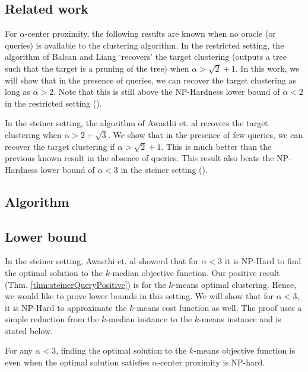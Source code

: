 \documentclass[orivec]{llncs}
\begin{document}
\subsection{Related work}
\label{section:relatedwork}
For $\alpha$-center proximity, the following results are known when no oracle (or queries) is available to the clustering algorithm. In the restricted setting, the algorithm of Balcan and Liang \cite{balcan2012clustering} `recovers' the target clustering (outputs a tree such that the target is a pruning of the tree) when $\alpha > \sqrt{2} + 1$. In this work, we will show that in the presence of queries, we can recover the target clustering as long as $\alpha > 2$. Note that this is still above the NP-Hardness lower bound of $\alpha < 2$ in the restricted setting (\cite{ben2014data}).

In the steiner setting, the algorithm of Awasthi et. al \cite{awasthi2012center} recovers the target clustering when $\alpha > 2+\sqrt{3}$. We show that in the presence of few queries, we can recover the target clustering if $\alpha > \sqrt{2}+1$. This is much better than the previous known result in the absence of queries. This result also beats the NP-Hardness lower bound of $\alpha < 3$ in the steiner setting (\cite{awasthi2012center}).

\subsection{Algorithm}


\subsection{Lower bound}
In the steiner setting, Awasthi et. al \cite{awasthi2012center} showerd that for $\alpha < 3$ it is NP-Hard to find the optimal solution to the $k$-median objective function. Our positive result (Thm. \ref{thm:steinerQueryPositive}) is for the $k$-means optimal clustering. Hence, we would like to prove lower bounds in this setting. We will show that for $\alpha < 3$, it is NP-Hard to approximate the $k$-means cost function as well. The proof uses a simple reduction from the $k$-median instance to the $k$-means instance and is stated below.

\begin{theorem}
For any $\alpha < 3$, finding the optimal solution to the $k$-means objective function is even when the optimal solution satisfies $\alpha$-center proximity is NP-hard.
\end{theorem}
\end{document}
